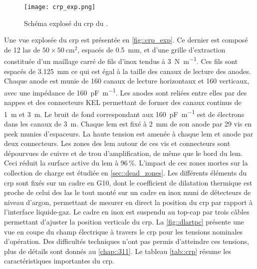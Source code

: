       \begin{figure}[htbp]
        \begin{center}\texttt{[image: crp\_exp.png]}\end{center}
        \caption[Schéma explosé du CRP du \TOO{}.]{\label{fig::crp_exp}Schéma explosé du \gls{crp} du \TOO{}.}
      \end{figure}

      Une vue explosée du \gls{crp} est présentée en \autoref{fig::crp_exp}. Ce dernier est composé de 12 \gls{las} de $50\times\SI{50}{\centi\meter\squared}$,  espacés de \SI{0.5}{\milli\meter}, et d'une grille d'extraction constituée d'un maillage carré de fils d'inox tendus à \SI{3}{\newton\per\meter}. Ces fils sont espacés de \SI{3.125}{\milli\meter} ce qui est égal à la taille des canaux de lecture des anodes. Chaque anode est munie de 160 canaux de lecture horizontaux et 160 verticaux, avec une impédance de \SI{160}{\pico\farad\per\meter}. Les anodes sont reliées entre elles par des nappes et des connecteurs KEL permettant de former des canaux continus de \SI{1}{\meter} et \SI{3}{\meter}. Le bruit de fond correspondant aux \SI{160}{\pico\farad\per\meter} est de  électrons dans les canaux de \SI{3}{\meter}\cite{Aimard2018}. Chaque \gls{lem} est fixé à \SI{2}{\milli\meter} de son anode par 29 vis en \gls{peek} munies d'espaceurs. La haute tension est amenée à chaque \gls{lem} et anode par deux connecteurs. Les zones des \gls{lem} autour de ces vis et connecteurs sont dépourvues de cuivre et de trou d'amplification, de même que le bord du \gls{lem}. Ceci réduit la surface active du \gls{lem} à 96\,\%. L'impact de ces zones mortes sur la collection de charge est étudiée en \autoref{sec::dead_zones}. Les différents éléments du \gls{crp} sont fixés sur un cadre en G10, dont le coefficient de dilatation thermique est proche de celui des \gls{las} le tout monté sur un cadre en inox muni de détecteurs de niveau d'argon, permettant de mesurer en direct la position du \gls{crp} par rapport à l'interface liquide-gaz. Le cadre en inox est suspendu au top-cap par trois câbles permettant d'ajuster la position verticale du \gls{crp}. La \autoref{fig::dlartpc} présente une vue en coupe du champ électrique à travers le \gls{crp} pour les tensions nominales d'opération. Des difficultés techniques n'ont pas permis d'atteindre ces tensions, plus de détails sont donnés au \autoref{chap::311}. Le tableau \autoref{tab::crp} résume les caractéristiques importantes du \gls{crp}.

